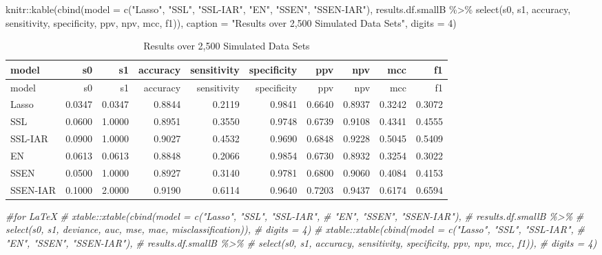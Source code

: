 \documentclass[
]{article}
\newenvironment{Shaded}{\begin{snugshade}}{\end{snugshade}}
\newcommand{\AttributeTok}[1]{\textcolor[rgb]{0.77,0.63,0.00}{#1}}
\newcommand{\CommentTok}[1]{\textcolor[rgb]{0.56,0.35,0.01}{\textit{#1}}}
\newcommand{\DecValTok}[1]{\textcolor[rgb]{0.00,0.00,0.81}{#1}}
\newcommand{\FunctionTok}[1]{\textcolor[rgb]{0.00,0.00,0.00}{#1}}
\newcommand{\NormalTok}[1]{#1}
\newcommand{\SpecialCharTok}[1]{\textcolor[rgb]{0.00,0.00,0.00}{#1}}
\newcommand{\StringTok}[1]{\textcolor[rgb]{0.31,0.60,0.02}{#1}}
\begin{document}
\begin{Shaded}
\begin{Highlighting}[]
\NormalTok{knitr}\SpecialCharTok{::}\FunctionTok{kable}\NormalTok{(}\FunctionTok{cbind}\NormalTok{(}\AttributeTok{model =} \FunctionTok{c}\NormalTok{(}\StringTok{"Lasso"}\NormalTok{, }\StringTok{"SSL"}\NormalTok{, }\StringTok{"SSL{-}IAR"}\NormalTok{,}
                             \StringTok{"EN"}\NormalTok{, }\StringTok{"SSEN"}\NormalTok{, }\StringTok{"SSEN{-}IAR"}\NormalTok{), }
\NormalTok{                   results.df.smallB }\SpecialCharTok{\%\textgreater{}\%} 
                     \FunctionTok{select}\NormalTok{(s0, s1, accuracy, sensitivity, specificity, ppv, npv, mcc, f1)),}
             \AttributeTok{caption =} \StringTok{"Results over 2,500 Simulated Data Sets"}\NormalTok{,}
             \AttributeTok{digits =} \DecValTok{4}\NormalTok{)}
\end{Highlighting}
\end{Shaded}

\begin{longtable}[]{@{}lrrrrrrrrr@{}}
\caption{Results over 2,500 Simulated Data Sets}\tabularnewline
\toprule
model & s0 & s1 & accuracy & sensitivity & specificity & ppv & npv & mcc
& f1 \\
\midrule
\endfirsthead
\toprule
model & s0 & s1 & accuracy & sensitivity & specificity & ppv & npv & mcc
& f1 \\
\midrule
\endhead
Lasso & 0.0347 & 0.0347 & 0.8844 & 0.2119 & 0.9841 & 0.6640 & 0.8937 &
0.3242 & 0.3072 \\
SSL & 0.0600 & 1.0000 & 0.8951 & 0.3550 & 0.9748 & 0.6739 & 0.9108 &
0.4341 & 0.4555 \\
SSL-IAR & 0.0900 & 1.0000 & 0.9027 & 0.4532 & 0.9690 & 0.6848 & 0.9228 &
0.5045 & 0.5409 \\
EN & 0.0613 & 0.0613 & 0.8848 & 0.2066 & 0.9854 & 0.6730 & 0.8932 &
0.3254 & 0.3022 \\
SSEN & 0.0500 & 1.0000 & 0.8927 & 0.3140 & 0.9781 & 0.6800 & 0.9060 &
0.4084 & 0.4153 \\
SSEN-IAR & 0.1000 & 2.0000 & 0.9190 & 0.6114 & 0.9640 & 0.7203 & 0.9437
& 0.6174 & 0.6594 \\
\bottomrule
\end{longtable}

\begin{Shaded}
\begin{Highlighting}[]
\CommentTok{\#for LaTeX}
\CommentTok{\# xtable::xtable(cbind(model = c("Lasso", "SSL", "SSL{-}IAR",}
\CommentTok{\#                              "EN", "SSEN", "SSEN{-}IAR"),}
\CommentTok{\#                    results.df.smallB \%\textgreater{}\%}
\CommentTok{\#                      select(s0, s1, deviance, auc, mse, mae, misclassification)),}
\CommentTok{\#                digits = 4)}
\CommentTok{\# xtable::xtable(cbind(model = c("Lasso", "SSL", "SSL{-}IAR",}
\CommentTok{\#                              "EN", "SSEN", "SSEN{-}IAR"),}
\CommentTok{\#                    results.df.smallB \%\textgreater{}\%}
\CommentTok{\#                      select(s0, s1, accuracy, sensitivity, specificity, ppv, npv, mcc, f1)),}
\CommentTok{\#                digits = 4)}
\end{Highlighting}
\end{Shaded}
\end{document}
